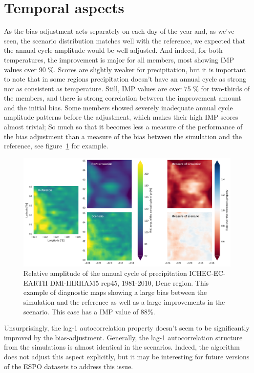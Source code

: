 \documentclass[letterpaper,10pt]{article}
\begin{document}
\section{Temporal aspects}
As the bias adjustment acts separately on each day of the year and, as we've seen, the scenario distribution matches well with the reference, we expected that the annual cycle amplitude would be well adjusted.
And indeed, for both temperatures, the improvement is major for all members, most showing IMP values over 90 \%.
Scores are slightly weaker for precipitation, but it is important to note that in some regions precipitation doesn't have an annual cycle as strong nor as consistent as temperature.
Still, IMP values are over 75 \% for two-thirds of the members, and there is strong correlation between the improvement amount and the initial bias.
Some members showed severely inadequate annual cycle amplitude patterns before the adjustment, which makes their high IMP scores almost trivial;
So much so that it becomes less a measure of the performance of the bias adjustment than a measure of the bias between the simulation and the reference, see figure~\ref{fig:acapr} for example.

\begin{figure}
\includegraphics[width=\textwidth]{../images/aca_pr_diags.pdf}
\caption{Relative amplitude of the annual cycle of precipitation ICHEC-EC-EARTH DMI-HIRHAM5 rcp45, 1981-2010, Dene region. This example of diagnostic maps showing a large bias between the simulation and the reference as well as a large improvements in the scenario. This case has a IMP value of 88\%.}\label{fig:acapr}
\end{figure}

Unsurprisingly, the lag-1 autocorrelation property doesn't seem to be significantly improved by the bias-adjustment.
Generally, the lag-1 autocorrelation structure from the simulations is almost identical in the scenarios.
Indeed, the algorithm does not adjust this aspect explicitly, but it may be interesting for future versions of the ESPO datasets to address this issue.
\end{document}
